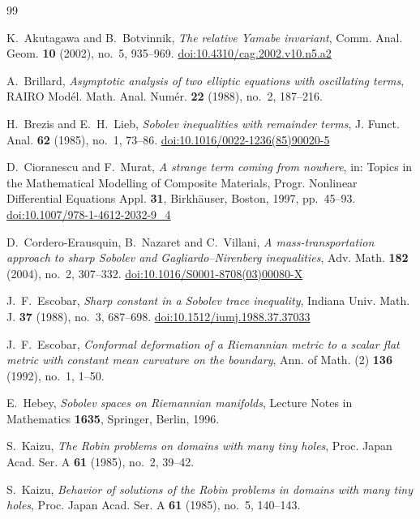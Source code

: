 \documentclass[11pt,reqno]{amsart}
\theoremstyle{plain}
\theoremstyle{definition}
\begin{document}
\begin{thebibliography}{99}

K.~Akutagawa and B.~Botvinnik,
\emph{The relative Yamabe invariant},
Comm. Anal. Geom. \textbf{10} (2002), no.~5, 935--969.
\href{https://doi.org/10.4310/cag.2002.v10.n5.a2}{doi:10.4310/cag.2002.v10.n5.a2}

A.~Brillard,
\emph{Asymptotic analysis of two elliptic equations with oscillating terms},
RAIRO Modél. Math. Anal. Numér. \textbf{22} (1988), no.~2, 187--216.

H.~Brezis and E.~H.~Lieb,
\emph{Sobolev inequalities with remainder terms},
J. Funct. Anal. \textbf{62} (1985), no.~1, 73--86.
\href{https://doi.org/10.1016/0022-1236(85)90020-5}{doi:10.1016/0022-1236(85)90020-5}

D.~Cioranescu and F.~Murat,
\emph{A strange term coming from nowhere},
in: Topics in the Mathematical Modelling of Composite Materials,
Progr. Nonlinear Differential Equations Appl. \textbf{31}, Birkhäuser, Boston,
1997, pp.~45--93.
\href{https://doi.org/10.1007/978-1-4612-2032-9_4}{doi:10.1007/978-1-4612-2032-9\_4}

D.~Cordero-Erausquin, B.~Nazaret and C.~Villani,
\emph{A mass-transportation approach to sharp Sobolev and Gagliardo--Nirenberg
inequalities},
Adv. Math. \textbf{182} (2004), no.~2, 307--332.
\href{https://doi.org/10.1016/S0001-8708(03)00080-X}{doi:10.1016/S0001-8708(03)00080-X}

J.~F.~Escobar,
\emph{Sharp constant in a Sobolev trace inequality},
Indiana Univ. Math. J. \textbf{37} (1988), no.~3, 687--698.
\href{https://doi.org/10.1512/iumj.1988.37.37033}{doi:10.1512/iumj.1988.37.37033}

J.~F.~Escobar,
\emph{Conformal deformation of a Riemannian metric to a scalar flat metric with
constant mean curvature on the boundary},
Ann. of Math. (2) \textbf{136} (1992), no.~1, 1--50.

E.~Hebey,
\emph{Sobolev spaces on Riemannian manifolds},
Lecture Notes in Mathematics \textbf{1635}, Springer, Berlin, 1996.

S.~Kaizu,
\emph{The Robin problems on domains with many tiny holes},
Proc. Japan Acad. Ser. A \textbf{61} (1985), no.~2, 39--42.

S.~Kaizu,
\emph{Behavior of solutions of the Robin problems in domains with many tiny holes},
Proc. Japan Acad. Ser. A \textbf{61} (1985), no.~5, 140--143.


\end{thebibliography}
\end{document}
